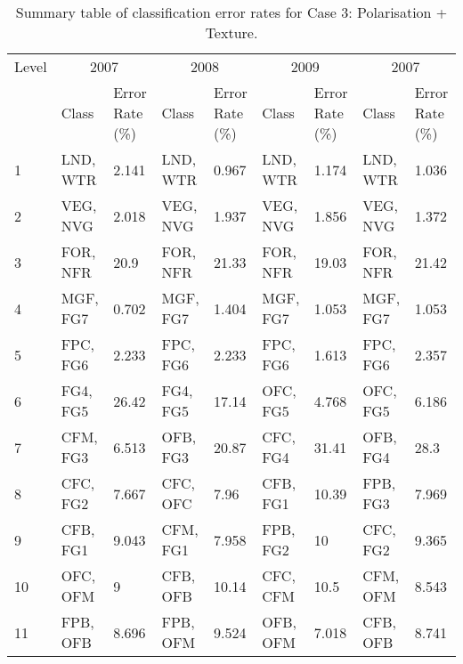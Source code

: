 \begin{appendices}
\begin{spacing}{1.0}
\begin{longtable}[h!]{ p{1cm} p{1.5cm} p{1cm} p{1.5cm} p{1cm} p{1.5cm} p{1cm} p{1.5cm} p{1cm} }
    \bottomrule
\end{longtable}
\end{spacing}

\begin{spacing}{1.0}
\begin{longtable}[h!]{ p{1cm} p{1.5cm} p{1cm} p{1.5cm} p{1cm} p{1.5cm} p{1cm} p{1.5cm} p{1cm} }

    \caption[Summary table of classification error rates for Case 3: Polarisation + Texture.]{Summary table of classification error rates for Case 3: Polarisation + Texture.}
    \label{tab: appendix-table.c3}\\
    
    \toprule
    Level & \multicolumn{2}{c}{2007} & \multicolumn{2}{c}{2008} & \multicolumn{2}{c}{2009} & \multicolumn{2}{c}{2007}\\
    \cmidrule{2-9}
    {} & Class & Error Rate (\%) & Class & Error Rate (\%) & Class & Error Rate (\%) & Class & Error Rate (\%)\\
    \midrule
    \endhead

    1 & LND, WTR & 2.141 & LND, WTR & 0.967 & LND, WTR & 1.174 & LND, WTR & 1.036\\
    \cmidrule{2-9}
    2 & VEG, NVG & 2.018 & VEG, NVG & 1.937 & VEG, NVG & 1.856 & VEG, NVG & 1.372\\
    \cmidrule{2-9}
    3 & FOR, NFR & 20.9 & FOR, NFR & 21.33 & FOR, NFR & 19.03 & FOR, NFR & 21.42\\
    \cmidrule{2-9}  
    4 & MGF, FG7 & 0.702 & MGF, FG7 & 1.404 & MGF, FG7 & 1.053 & MGF, FG7 & 1.053\\
    \cmidrule{2-9}    
    5 & FPC, FG6 & 2.233 & FPC, FG6 & 2.233 & FPC, FG6 & 1.613 & FPC, FG6 & 2.357\\
    \cmidrule{2-9}
    6 & FG4, FG5 & 26.42 & FG4, FG5 & 17.14 & OFC, FG5 & 4.768 & OFC, FG5 & 6.186\\
    \cmidrule{2-9}
    7 & CFM, FG3 & 6.513 & OFB, FG3 & 20.87 & CFC, FG4 & 31.41 & OFB, FG4 & 28.3\\
    \cmidrule{2-9}
    8 & CFC, FG2 & 7.667 & CFC, OFC & 7.96 & CFB, FG1 & 10.39 & FPB, FG3 & 7.969\\
    \cmidrule{2-9}
    9 & CFB, FG1 & 9.043 & CFM, FG1 & 7.958 & FPB, FG2 & 10 & CFC, FG2 & 9.365\\
    \cmidrule{2-9}
    10 & OFC, OFM & 9 & CFB, OFB & 10.14 & CFC, CFM & 10.5 & CFM, OFM & 8.543\\
    \cmidrule{2-9}
    11 & FPB, OFB & 8.696 & FPB, OFM & 9.524 & OFB, OFM & 7.018 & CFB, OFB & 8.741\\
	

\end{longtable}
\end{spacing}
\end{appendices}

